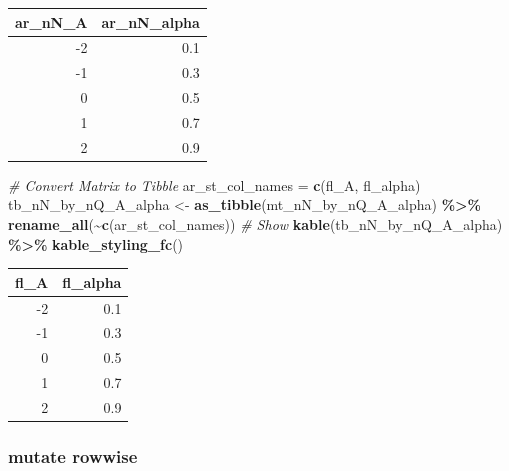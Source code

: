 \documentclass[
]{book}
\newenvironment{Shaded}{\begin{snugshade}}{\end{snugshade}}
\newcommand{\CommentTok}[1]{\textcolor[rgb]{0.56,0.35,0.01}{\textit{#1}}}
\newcommand{\KeywordTok}[1]{\textcolor[rgb]{0.13,0.29,0.53}{\textbf{#1}}}
\newcommand{\NormalTok}[1]{#1}
\newcommand{\OperatorTok}[1]{\textcolor[rgb]{0.81,0.36,0.00}{\textbf{#1}}}
\newcommand{\StringTok}[1]{\textcolor[rgb]{0.31,0.60,0.02}{#1}}
\begin{document}
\begin{table}[!h]
\centering
\begin{tabular}{r|r}
\hline
ar\_nN\_A & ar\_nN\_alpha\\
\hline
\rowcolor{gray!6}  -2 & 0.1\\
\hline
-1 & 0.3\\
\hline
\rowcolor{gray!6}  0 & 0.5\\
\hline
1 & 0.7\\
\hline
\rowcolor{gray!6}  2 & 0.9\\
\hline
\end{tabular}
\end{table}

\begin{Shaded}
\begin{Highlighting}[]
\CommentTok{\# Convert Matrix to Tibble}
\NormalTok{ar\_st\_col\_names =}\StringTok{ }\KeywordTok{c}\NormalTok{(}\StringTok{\textquotesingle{}fl\_A\textquotesingle{}}\NormalTok{, }\StringTok{\textquotesingle{}fl\_alpha\textquotesingle{}}\NormalTok{)}
\NormalTok{tb\_nN\_by\_nQ\_A\_alpha \textless{}{-}}\StringTok{ }\KeywordTok{as\_tibble}\NormalTok{(mt\_nN\_by\_nQ\_A\_alpha) }\OperatorTok{\%\textgreater{}\%}
\StringTok{  }\KeywordTok{rename\_all}\NormalTok{(}\OperatorTok{\textasciitilde{}}\KeywordTok{c}\NormalTok{(ar\_st\_col\_names))}
\CommentTok{\# Show}
\KeywordTok{kable}\NormalTok{(tb\_nN\_by\_nQ\_A\_alpha) }\OperatorTok{\%\textgreater{}\%}
\StringTok{  }\KeywordTok{kable\_styling\_fc}\NormalTok{()}
\end{Highlighting}
\end{Shaded}

\begin{table}[!h]
\centering
\begin{tabular}{r|r}
\hline
fl\_A & fl\_alpha\\
\hline
\rowcolor{gray!6}  -2 & 0.1\\
\hline
-1 & 0.3\\
\hline
\rowcolor{gray!6}  0 & 0.5\\
\hline
1 & 0.7\\
\hline
\rowcolor{gray!6}  2 & 0.9\\
\hline
\end{tabular}
\end{table}

\hypertarget{mutate-rowwise}{%
\subsubsection{mutate rowwise}\label{mutate-rowwise}}
\end{document}
